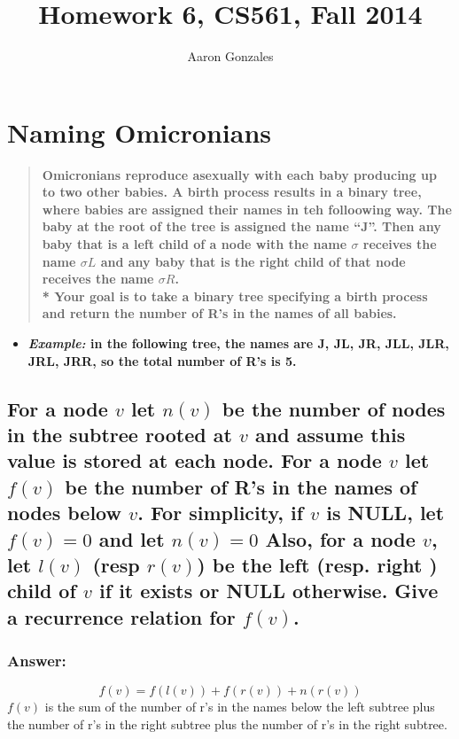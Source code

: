 \documentclass[titlepage]{article}
\theoremstyle{definition}
\begin{document}
\title{Homework 6, CS561, Fall 2014}
\author{Aaron Gonzales}
\maketitle

\section{Naming Omicronians}
  \begin{quote}
    \textbf{Omicronians reproduce asexually with each baby producing up to two
    other babies. A birth process results in a binary tree, where babies are
    assigned their names in teh folloowing way. The baby at the root of the tree
    is assigned the name ``J''. Then any baby that is a left child of a node with
    the name $\sigma$ receives the name $\sigma L$ and any baby that is the right
    child of that node receives the name $\sigma R$. \\*
    Your goal is to take a binary tree specifying a birth process and return the
    number of R's in the names of all babies.}
  \end{quote}
  \begin{itemize}
    \item \textbf{\emph{Example:} in the following tree, the names are J, JL,
    JR, JLL, JLR, JRL, JRR, so the total number of R's is 5.  }
  \end{itemize}

  \subsection{For a node $v$ let $n(v)$ be the number of nodes in the subtree
    rooted at $v$ and assume this value is stored at each node. For a node $v$
    let $f(v)$ be the number of R's in the names of nodes below $v$. For
    simplicity, if $v$ is NULL, let $f(v) = 0$ and let $n(v) = 0$ Also, for a
    node $v$, let $l(v)$ (resp $r(v)$) be the left (resp. right ) child of $v$
    if it exists or NULL otherwise. Give a recurrence relation for $f(v)$.}
    \subsubsection{Answer:}
      \[ f(v) = f\left( l (v) \right) + f\left( r (v) \right) + n\left( r(v) \right) \]
      $f(v)$ is the sum of the number of r's in the names below the left subtree plus
      the number of r's in the right subtree plus the number of r's in the right
      subtree.
\end{document}
